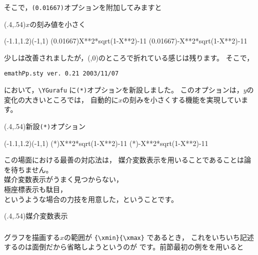 そこで，\verb+(0.01667)+オプションを附加してみますと

\begin{showEx}(.4,.54){$x$の刻み値を小さく}
\begin{zahyou}[ul=30mm]
  (-1.1,1.2)(-1,1)%
\def\Fx{X**2*sqrt(1-X**2)}%
\def\Gx{-X**2*sqrt(1-X**2)}%
\YGurafu(0.01667)\Fx{-1}{1}
\YGurafu(0.01667)\Gx{-1}{1}
\end{zahyou}
\end{showEx}

少しは改善されましたが，\retu(,0)のところで折れている感じは残ります。
そこで，
\begin{jquote}
\begin{verbatim}
emathPp.sty ver. 0.21 2003/11/07
\end{verbatim}
\end{jquote}
において，\verb+\YGurafu+ に\verb+(*)+オプションを新設しました。
このオプションは，$y$の変化の大きいところでは，
自動的に$x$の刻みを小さくする機能を実現しています。

\begin{showEx}(.4,.54){新設\texttt{(*)}オプション}
\begin{zahyou}[ul=30mm]
  (-1.1,1.2)(-1,1)%
\def\Fx{X**2*sqrt(1-X**2)}%
\def\Gx{-X**2*sqrt(1-X**2)}%
\YGurafu(*)\Fx{-1}{1}
\YGurafu(*)\Gx{-1}{1}
\end{zahyou}
\end{showEx}

この場面における最善の対応法は，
媒介変数表示を用いることであることは論を待ちません。\\
媒介変数表示がうまく見つからない，\\
極座標表示も駄目，\\
というような場合の力技を用意した，ということです。

\begin{showEx}(.4,.54){媒介変数表示}
\end{showEx}

\subsubsection{}
グラフを描画する$x$の範囲が \verb+{\xmin}{\xmax}+ であるとき，
これをいちいち記述するのは面倒だから省略しようというのが
です。前節最初の例をを用いると

